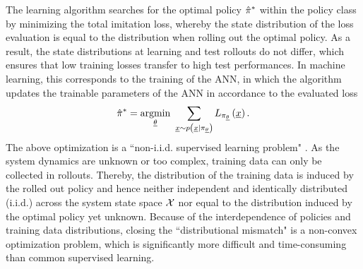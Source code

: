 The learning algorithm searches for the optimal policy 
$\hat{\pi}^*$
within the policy class by minimizing the total imitation loss, 
whereby the state distribution of the loss evaluation 
is equal to the distribution when rolling out the optimal policy.
As a result, the state distributions at learning and test rollouts 
do not differ, which ensures that low training losses 
transfer to high test performances.
In machine learning, this corresponds to the training of the ANN, 
in which the algorithm updates the trainable parameters of the ANN 
in accordance to the evaluated loss
\begin{equation}
    \hat{\pi}^*
    =
    \underset{\underline{\theta}}{\mathrm{argmin}}\ 
    \sum_{
        \underline{x} \sim p \left({
            \underline{x} | \pi_{\underline{\theta}}}\right)
    }
    L_{\pi_{\underline{\theta}}} \left({\underline{x}}\right)
    .
\end{equation}
The above optimization is a 
``non-i.i.d. supervised learning problem" \cite{Ross2010}. 
As the system dynamics are unknown or too complex, 
training data can only be collected in rollouts. 
Thereby, the distribution of the training data is induced 
by the rolled out policy and hence 
neither independent and identically distributed (i.i.d.) 
across the system state space $\mathcal{X}$ 
nor equal to the distribution 
induced by the optimal policy yet unknown. 
Because of the interdependence of policies and training data distributions, 
closing the ``distributional mismatch" \cite{RobotAutonomy2} 
is a non-convex optimization problem, 
which is significantly more difficult and time-consuming 
than common supervised learning.





